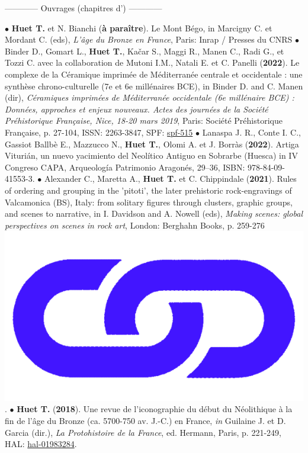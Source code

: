\documentclass{article}
\begin{document}
\bigbreak
\begin{center}------------ Ouvrages (chapitres d') ------------\end{center}
\smallbreak
$\bullet$ \textbf{Huet T.} et N. Bianchi (\textbf{à paraître}). Le Mont Bégo, in Marcigny C. et Mordant C. (eds), \textit{L'âge du Bronze en France}, Paris: Inrap / Presses du CNRS
\smallbreak
$\bullet$ Binder D., Gomart L., \textbf{Huet T.}, Ka{\v{c}}ar S., Maggi R., Manen C., Radi G., et Tozzi C. avec la collaboration de Mutoni I.M., Natali E. et C. Panelli (\textbf{2022}). Le complexe de la C\'{e}ramique imprim\'{e}e de M\'{e}diterran\'{e}e centrale et occidentale : une synthèse chrono-culturelle (7e et 6e millénaires BCE), in Binder D. and C. Manen (dir), \textit{C\'{e}ramiques imprim\'{e}es de M\'{e}diterran\'{e}e occidentale (6e mill\'{e}naire BCE) : Donn\'{e}es, approches et enjeux nouveaux. Actes des journ\'{e}es de la Soci\'{e}t\'{e} Pr\'{e}historique Fran\c{c}aise, Nice, 18-20 mars 2019}, Paris: Soci\'{e}t\'{e} Pr\'{e}historique Fran\c{c}aise, p. 27-104, ISSN: 2263-3847, SPF: \href{https://www.prehistoire.org/515_p_57657/accEs-libre-seance-18-ceramiques-imprimees-de-mediterranee-occidentale.html}{spf-515}
\smallbreak
$\bullet$ Lanaspa J. R., Conte I. C., Gassiot Ballbè E., Mazzucco N., \textbf{Huet T.}, Olomi A. et J. Borràs (\textbf{2022}). Artiga Viturián, un nuevo yacimiento del Neolítico Antiguo en Sobrarbe (Huesca) in IV Congreso CAPA, Arqueología Patrimonio Aragonés, 29–36, ISBN: 978-84-09-41553-3.
\smallbreak
$\bullet$ Alexander C., Maretta A., \textbf{Huet T.} et C. Chippindale (\textbf{2021}). Rules of ordering and grouping in the 'pitoti', the later prehistoric rock-engravings of Valcamonica (BS), Italy: from solitary figures through clusters, graphic groups, and scenes to narrative, in I. Davidson and A. Nowell (eds), \textit{Making scenes: global perspectives on scenes in rock art}, London: Berghahn Books, p. 259-276 \href{https://www.berghahnbooks.com/title/DavidsonMaking}{\includegraphics[scale=0.02]{link_darkblue.png}}.
\smallbreak
$\bullet$ \textbf{Huet T.} (\textbf{2018}). Une revue de l'iconographie du d\'{e}but du N\'{e}olithique \`{a} la fin de l'\^{a}ge du Bronze (ca. 5700-750 av. J.-C.) en France, \textit{in} Guilaine J. et D. Garcia (dir.), \textit{La Protohistoire de la France}, ed. Hermann, Paris, p. 221-249, HAL: \href{https://hal.archives-ouvertes.fr/hal-01983284}{hal-01983284}.
\bigbreak
\end{document}

